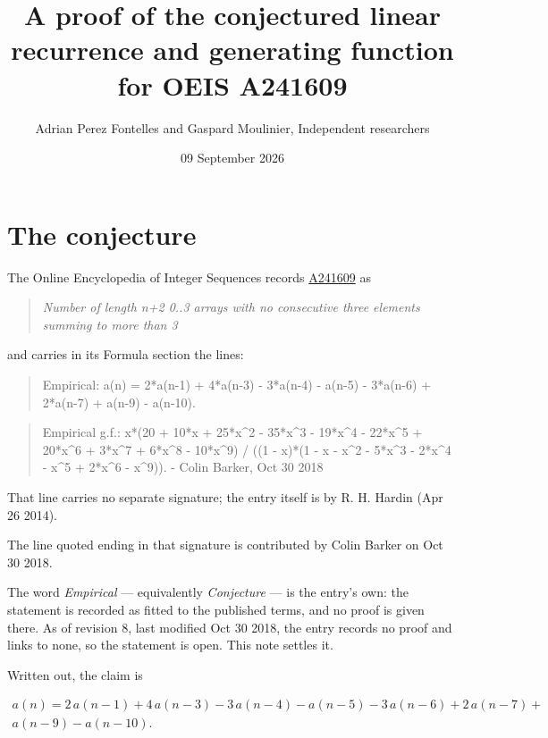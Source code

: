 \documentclass[11pt]{article}
\title{A proof of the conjectured linear recurrence and generating function for OEIS A241609}
\author{Adrian Perez Fontelles and Gaspard Moulinier, Independent researchers}
\date{09 September 2026}
\theoremstyle{definition}
\begin{document}
\maketitle
\section{The conjecture}

The Online Encyclopedia of Integer Sequences records \href{https://oeis.org/A241609}{A241609} as

\begin{quote}\itshape Number of length n+2 0..3 arrays with no consecutive three elements summing to more than 3\end{quote}

and carries in its Formula section the lines:

\begin{quote}\ttfamily Empirical: a(n) = 2*a(n-1) + 4*a(n-3) - 3*a(n-4) - a(n-5) - 3*a(n-6) + 2*a(n-7) + a(n-9) - a(n-10).\end{quote}

\begin{quote}\ttfamily Empirical g.f.: x*(20 + 10*x + 25*x\textasciicircum{}2 - 35*x\textasciicircum{}3 - 19*x\textasciicircum{}4 - 22*x\textasciicircum{}5 + 20*x\textasciicircum{}6 + 3*x\textasciicircum{}7 + 6*x\textasciicircum{}8 - 10*x\textasciicircum{}9) / ((1 - x)*(1 - x - x\textasciicircum{}2 - 5*x\textasciicircum{}3 - 2*x\textasciicircum{}4 - x\textasciicircum{}5 + 2*x\textasciicircum{}6 - x\textasciicircum{}9)). - Colin Barker, Oct 30 2018\end{quote}

That line carries no separate signature; the entry itself is by R. H. Hardin (Apr 26 2014).

The line quoted ending in that signature is contributed by Colin Barker on Oct 30 2018.

The word {\itshape Empirical} --- equivalently {\itshape Conjecture} --- is the entry's own: the statement is recorded as fitted to the published terms, and no proof is given there. As of revision 8, last modified Oct 30 2018, the entry records no proof and links to none, so the statement is open. This note settles it.

Written out, the claim is

\begin{multline*} a(n) = 2\,a(n-1) + 4\,a(n-3) - 3\,a(n-4) - a(n-5) - 3\,a(n-6) + 2\,a(n-7) + \\ a(n-9) - a(n-10). \end{multline*}
\end{document}
